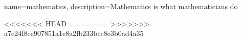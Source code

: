 {
    name=mathematics,
    description={Mathematics is what mathematicians do}
}



<<<<<<< HEAD
=======
>>>>>>> a7e24f8ee907851a1e8a2fb233bec8e3b0ad4a35
